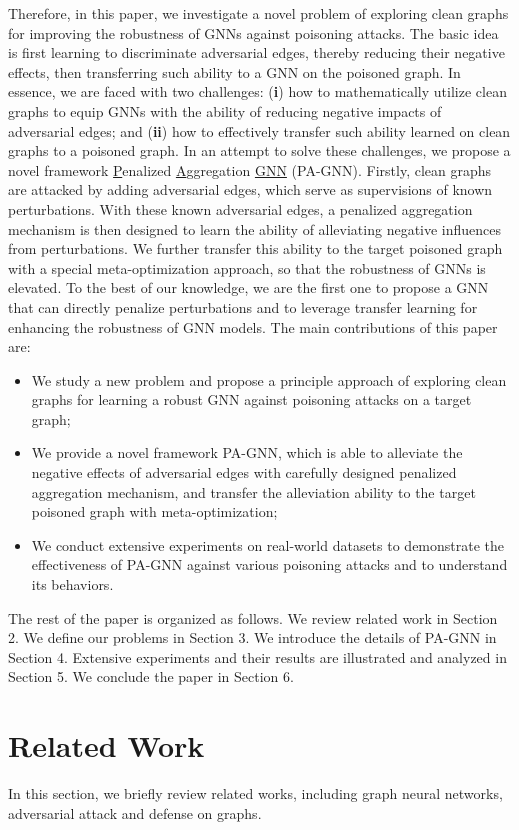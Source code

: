 \documentclass[sigconf]{acmart}
\newcommand{\our}{{PA-GNN}\xspace}
\newcommand{\ours}{{PA-GNN}\xspace}
\begin{document}
Therefore, in this paper, we investigate a novel problem of exploring clean graphs for improving the robustness of GNNs against poisoning attacks.
The basic idea is first learning to discriminate adversarial edges, thereby reducing their negative effects, then transferring such ability to a GNN on the poisoned graph.
In essence, we are faced with two challenges: (\textbf{i}) how to mathematically utilize clean graphs to equip GNNs with the ability of reducing negative impacts of adversarial edges; and (\textbf{ii}) how to effectively transfer such ability learned on clean graphs to a poisoned graph.
In an attempt to solve these challenges, we propose a novel framework \underline{P}enalized \underline{A}ggregation \underline{GNN} (\our). Firstly, clean graphs are attacked by adding adversarial edges, which serve as supervisions of known perturbations. With these known adversarial edges, a penalized aggregation mechanism is then designed to learn the ability of alleviating negative influences from perturbations. We further transfer this ability to the target poisoned graph with a special meta-optimization approach, so that the robustness of GNNs is elevated. To the best of our knowledge, we are the first one to propose a GNN that can directly penalize perturbations and to leverage transfer learning for enhancing the robustness of GNN models.
The main contributions of this paper are:
\begin{itemize}[leftmargin=*]
    \item We study a new problem and propose a principle approach of exploring clean graphs for learning a robust GNN against poisoning attacks on a target graph;
    \item We provide a novel framework \our, which is able to alleviate the negative effects of adversarial edges with carefully designed penalized aggregation mechanism, and transfer the alleviation ability to the target poisoned graph with meta-optimization;
    \item We conduct extensive experiments on  real-world datasets to demonstrate the effectiveness of \our against various poisoning attacks and to understand its behaviors.
\end{itemize}

The rest of the paper is organized as follows. We review related work in Section 2. We define our problems in Section 3. We introduce the details of \ours in Section 4. Extensive experiments and their results are illustrated and analyzed in Section 5. We conclude the paper in Section 6. \section{Related Work}
In this section, we briefly review related works, including graph neural networks, adversarial attack and defense on graphs.
\end{document}
